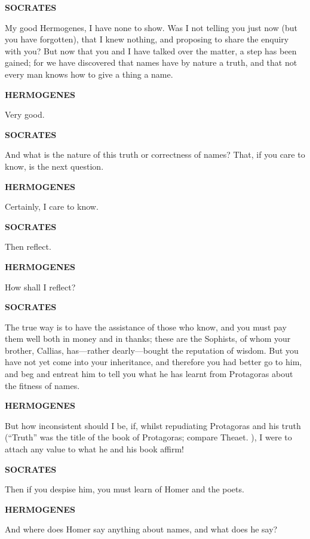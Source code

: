 \documentclass[11pt,letter]{article}
\begin{document}
\par \textbf{SOCRATES}
\par   My good Hermogenes, I have none to show. Was I not telling you just now (but you have forgotten), that I knew nothing, and proposing to share the enquiry with you? But now that you and I have talked over the matter, a step has been gained; for we have discovered that names have by nature a truth, and that not every man knows how to give a thing a name.

\par \textbf{HERMOGENES}
\par   Very good.

\par \textbf{SOCRATES}
\par   And what is the nature of this truth or correctness of names? That, if you care to know, is the next question.

\par \textbf{HERMOGENES}
\par   Certainly, I care to know.

\par \textbf{SOCRATES}
\par   Then reflect.

\par \textbf{HERMOGENES}
\par   How shall I reflect?

\par \textbf{SOCRATES}
\par   The true way is to have the assistance of those who know, and you must pay them well both in money and in thanks; these are the Sophists, of whom your brother, Callias, has—rather dearly—bought the reputation of wisdom. But you have not yet come into your inheritance, and therefore you had better go to him, and beg and entreat him to tell you what he has learnt from Protagoras about the fitness of names.

\par \textbf{HERMOGENES}
\par   But how inconsistent should I be, if, whilst repudiating Protagoras and his truth (“Truth” was the title of the book of Protagoras; compare Theaet. ), I were to attach any value to what he and his book affirm!

\par \textbf{SOCRATES}
\par   Then if you despise him, you must learn of Homer and the poets.

\par \textbf{HERMOGENES}
\par   And where does Homer say anything about names, and what does he say?
\end{document}
